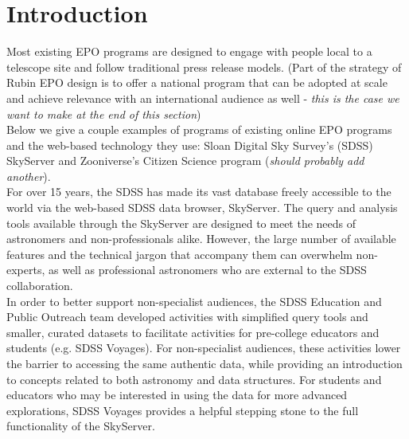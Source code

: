 \section{Introduction}\label{sec:intro}

Most existing EPO programs are designed to engage with people local to a telescope site and follow traditional press release models. (Part of the strategy of Rubin EPO design is to offer a national program that can be adopted at scale and achieve relevance with an international audience as well - {\it this is the case we want to make at the end of this section})\\

Below we give a couple examples of programs of existing online EPO programs and the web-based technology they use: Sloan Digital Sky Survey's (SDSS) SkyServer and Zooniverse's Citizen Science program ({\it should probably add another}).\\

For over 15 years, the SDSS has made its vast database freely accessible to the world via the web-based SDSS data browser, SkyServer. The query and analysis tools available through the SkyServer are designed to meet the needs of astronomers and non-professionals alike.  However, the large number of available features and the technical jargon that accompany them can overwhelm non-experts, as well as professional astronomers who are external to the SDSS collaboration.\\

In order to better support non-specialist audiences, the SDSS Education and Public Outreach team developed activities with simplified query tools and smaller, curated datasets to facilitate activities for pre-college educators and students (e.g. SDSS Voyages). For non-specialist audiences, these activities lower the barrier to accessing the same authentic data, while providing an introduction to concepts related to both astronomy and data structures. For students and educators who may be interested in using the data for more advanced explorations, SDSS Voyages provides a helpful stepping stone to the full functionality of the SkyServer. \\

